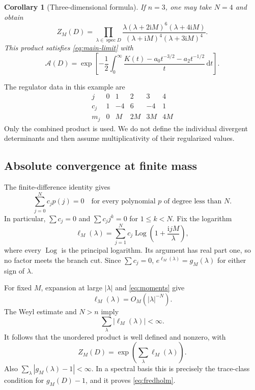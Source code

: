 \documentclass[11pt,a4paper]{article}
\newtheorem{corollary}[theorem]{Corollary}
\theoremstyle{remark}
\DeclareMathOperator{\spec}{spec}
\DeclareMathOperator{\Log}{Log}
\newcommand{\ii}{\mathrm i}
\newcommand{\dd}{\,\mathrm d}
\numberwithin{equation}{section}
\begin{document}
\begin{corollary}[Three-dimensional formula]\label{cor:3d}
If $n=3$, one may take $N=4$ and obtain
\begin{equation}\label{eq:3d-product}
 Z_M(D)=\prod_{\lambda\in\spec D}
 \frac{\lambda(\lambda+2\ii M)^6(\lambda+4\ii M)}
      {(\lambda+\ii M)^4(\lambda+3\ii M)^4}.
\end{equation}
This product satisfies \eqref{eq:main-limit} with
\begin{equation}\label{eq:3d-amplitude}
 \mathcal A(D)=\exp\!\left[-\frac12\int_0^\infty
 \frac{K(t)-a_0t^{-3/2}-a_2t^{-1/2}}{t}\dd t\right].
\end{equation}
\end{corollary}

The regulator data in this example are
\[
\begin{array}{c|rrrrr}
 j&0&1&2&3&4\\\hline
 c_j&1&-4&6&-4&1\\
 m_j&0&M&2M&3M&4M
\end{array}
\]
Only the combined product is used. We do not define the individual
divergent determinants and then assume multiplicativity of their
regularized values.

\subsection{Absolute convergence at finite mass}

The finite-difference identity gives
\begin{equation}\label{eq:moments}
 \sum_{j=0}^N c_jp(j)=0
 \quad\text{for every polynomial $p$ of degree less than $N$}.
\end{equation}
In particular, $\sum c_j=0$ and $\sum c_jj^k=0$ for $1\le k<N$.
Fix the logarithm
\begin{equation}\label{eq:ell}
 \ell_M(\lambda)=\sum_{j=1}^Nc_j
       \Log\!\left(1+\frac{\ii jM}{\lambda}\right),
\end{equation}
where every $\Log$ is the principal logarithm. Its argument has real
part one, so no factor meets the branch cut. Since $\sum c_j=0$,
$e^{\ell_M(\lambda)}=g_M(\lambda)$ for either sign of $\lambda$.

For fixed $M$, expansion at large $|\lambda|$ and
\eqref{eq:moments} give
\begin{equation}\label{eq:tail}
 \ell_M(\lambda)=O_M(|\lambda|^{-N}).
\end{equation}
The Weyl estimate and $N>n$ imply
\begin{equation}\label{eq:abs-sum}
 \sum_\lambda|\ell_M(\lambda)|<\infty.
\end{equation}
It follows that the unordered product is well defined and nonzero,
with
\begin{equation}\label{eq:Z-log}
 Z_M(D)=\exp\!\left(\sum_\lambda\ell_M(\lambda)\right).
\end{equation}
Also $\sum_\lambda|g_M(\lambda)-1|<\infty$. In a spectral basis this
is precisely the trace-class condition for $g_M(D)-1$, and it proves
\eqref{eq:fredholm}.
\end{document}
